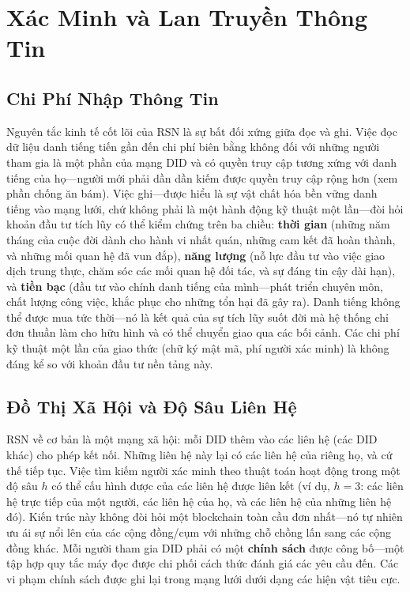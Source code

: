 \documentclass[11pt,a4paper,twocolumn]{article}
\begin{document}
\section{Xác Minh và Lan Truyền Thông Tin}

\subsection{Chi Phí Nhập Thông Tin}

Nguyên tắc kinh tế cốt lõi của RSN là sự bất đối xứng giữa đọc và ghi. Việc đọc dữ liệu danh tiếng tiến gần đến chi phí biên bằng không đối với những người tham gia là một phần của mạng DID và có quyền truy cập tương xứng với danh tiếng của họ---người mới phải dần dần kiếm được quyền truy cập rộng hơn (xem phần chống ăn bám). Việc ghi---được hiểu là sự vật chất hóa bền vững danh tiếng vào mạng lưới, chứ không phải là một hành động kỹ thuật một lần---đòi hỏi khoản đầu tư tích lũy có thể kiểm chứng trên ba chiều: \textbf{thời gian} (những năm tháng của cuộc đời dành cho hành vi nhất quán, những cam kết đã hoàn thành, và những mối quan hệ đã vun đắp), \textbf{năng lượng} (nỗ lực đầu tư vào việc giao dịch trung thực, chăm sóc các mối quan hệ đối tác, và sự đáng tin cậy dài hạn), và \textbf{tiền bạc} (đầu tư vào chính danh tiếng của mình---phát triển chuyên môn, chất lượng công việc, khắc phục cho những tổn hại đã gây ra). Danh tiếng không thể được mua tức thời---nó là kết quả của sự tích lũy suốt đời mà hệ thống chỉ đơn thuần làm cho hữu hình và có thể chuyển giao qua các bối cảnh. Các chi phí kỹ thuật một lần của giao thức (chữ ký mật mã, phí người xác minh) là không đáng kể so với khoản đầu tư nền tảng này.

\subsection{Đồ Thị Xã Hội và Độ Sâu Liên Hệ}

RSN về cơ bản là một mạng xã hội: mỗi DID thêm vào các liên hệ (các DID khác) cho phép kết nối. Những liên hệ này lại có các liên hệ của riêng họ, và cứ thế tiếp tục. Việc tìm kiếm người xác minh theo thuật toán hoạt động trong một độ sâu $h$ có thể cấu hình được của các liên hệ được liên kết (ví dụ, $h=3$: các liên hệ trực tiếp của một người, các liên hệ của họ, và các liên hệ của những liên hệ đó). Kiến trúc này không đòi hỏi một blockchain toàn cầu đơn nhất---nó tự nhiên ưu ái sự nổi lên của các cộng đồng/cụm với những chỗ chồng lấn sang các cộng đồng khác. Mỗi người tham gia DID phải có một \textbf{chính sách} được công bố---một tập hợp quy tắc máy đọc được chi phối cách thức đánh giá các yêu cầu đến. Các vi phạm chính sách được ghi lại trong mạng lưới dưới dạng các hiện vật tiêu cực.
\end{document}
